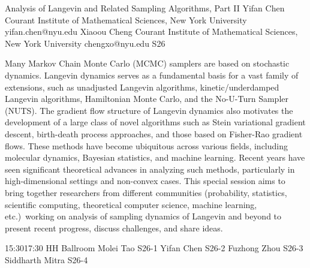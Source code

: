 \documentclass[12pt,lettersize,oneside]{book} %
\begin{document}
\begin{session}
 {Analysis of Langevin and Related Sampling Algorithms, Part II}%
 {Yifan Chen}%
 {Courant Institute of Mathematical Sciences, New York University}%
 {yifan.chen@nyu.edu}%
 {Xiaoou Cheng}%
 {Courant Institute of Mathematical Sciences, New York University}%
 {chengxo@nyu.edu}%
 {S26}%
 {}%

 {}
 Many Markov Chain Monte Carlo (MCMC) samplers are based on stochastic dynamics. Langevin dynamics serves as a fundamental basis for a vast family of extensions, such as unadjusted Langevin algorithms, kinetic/underdamped Langevin algorithms, Hamiltonian Monte Carlo, and the No-U-Turn Sampler (NUTS). The gradient flow structure of Langevin dynamics also motivates the development of a large class of novel algorithms such as Stein variational gradient descent, birth-death process approaches, and those based on Fisher-Rao gradient flows. These methods have become ubiquitous across various fields, including molecular dynamics, Bayesian statistics, and machine learning. Recent years have seen significant theoretical advances in analyzing such methods, particularly in high-dimensional settings and non-convex cases. This special session aims to bring together researchers from different communities (probability, statistics, scientific computing, theoretical computer science, machine learning, etc.)\ working on analysis of sampling dynamics of Langevin and beyond to present recent progress, discuss challenges, and share ideas.
\end{session}



\sessionPart{}%
{\hfill{}
{15:30}{17:30} %
{HH Ballroom}} %
{Molei Tao}
{S26-1}
{Yifan Chen}
{S26-2}
{Fuzhong Zhou}
{S26-3}
{Siddharth Mitra}
{S26-4}
\end{document}
